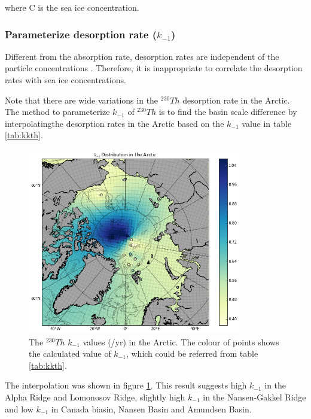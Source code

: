 \documentclass[paper=a4, fontsize=11pt]{scrartcl} %
\numberwithin{equation}{section} %
\numberwithin{figure}{section} %
\numberwithin{table}{section} %
\begin{document}
where C is the sea ice concentration.



\subsubsection{Parameterize desorption rate ($k_{-1}$)}

Different from the absorption rate, desorption rates are independent of the particle concentrations \cite{k-1}. Therefore, it is inappropriate to correlate the desorption rates with sea ice concentrations. 

Note that there are wide variations in the $^{230}Th$ desorption rate in the Arctic. The method to parameterize $k_{-1}$ of $^{230}Th$ is to find the basin scale difference by interpolating\footnotemark[5] the desorption rates in the Arctic based on the $k_{-1}$ value in table \ref{tab:kkth}. 

\begin{figure}[h!]
\centering
\includegraphics[width=22pc]{Figures/k_1_Th_distribution.pdf}
\caption{The $^{230}Th$ $k_{-1}$ values (/yr) in the Arctic. The colour of points shows the calculated value of $k_{-1}$, which could be referred from table \ref{tab:kkth}.}
\label{fig:k-1}
\end{figure}


The interpolation was shown in figure \ref{fig:k-1}. This result suggests high $k_{-1}$ in the Alpha Ridge and Lomonosov Ridge, slightly high $k_{-1}$ in the Nansen-Gakkel Ridge and low $k_{-1}$ in Canada biasin, Nansen Basin and Amundsen Basin. 
\end{document}
